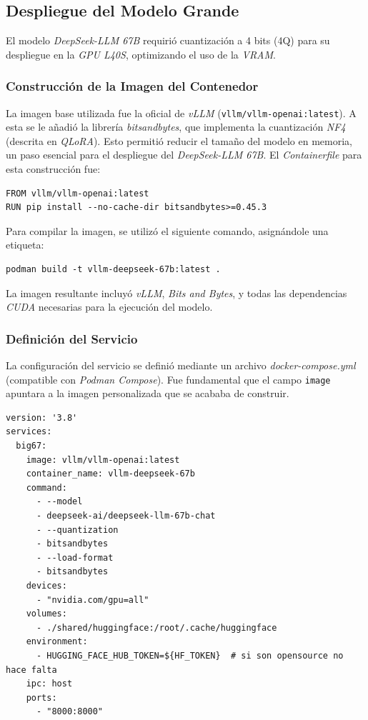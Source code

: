\subsection{Despliegue del Modelo Grande}
El modelo \textit{DeepSeek-LLM 67B} requirió cuantización a 4 bits (4Q) para su despliegue en la \textit{GPU L40S}, optimizando el uso de la \textit{VRAM}.

\subsubsection{Construcción de la Imagen del Contenedor}
La imagen base utilizada fue la oficial de \textit{vLLM} (\texttt{vllm/vllm-openai:latest}). A esta se le añadió la librería \textit{bitsandbytes}, que implementa la cuantización \textit{NF4} (descrita en \textit{QLoRA}). Esto permitió reducir el tamaño del modelo en memoria, un paso esencial para el despliegue del \textit{DeepSeek-LLM 67B}.
El \textit{Containerfile} para esta construcción fue:
\begin{verbatim}
FROM vllm/vllm-openai:latest
RUN pip install --no-cache-dir bitsandbytes>=0.45.3
\end{verbatim}

Para compilar la imagen, se utilizó el siguiente comando, asignándole una etiqueta:
\begin{verbatim}
podman build -t vllm-deepseek-67b:latest .
\end{verbatim}

La imagen resultante incluyó \textit{vLLM}, \textit{Bits and Bytes}, y todas las dependencias \textit{CUDA} necesarias para la ejecución del modelo.

\subsubsection{Definición del Servicio}
La configuración del servicio se definió mediante un archivo \textit{docker-compose.yml} (compatible con \textit{Podman Compose}). Fue fundamental que el campo \texttt{image} apuntara a la imagen personalizada que se acababa de construir.
\begin{verbatim}
version: '3.8'
services:
  big67:
    image: vllm/vllm-openai:latest
    container_name: vllm-deepseek-67b
    command:
      - --model
      - deepseek-ai/deepseek-llm-67b-chat
      - --quantization
      - bitsandbytes
      - --load-format
      - bitsandbytes
    devices:
      - "nvidia.com/gpu=all"
    volumes:
      - ./shared/huggingface:/root/.cache/huggingface
    environment:
      - HUGGING_FACE_HUB_TOKEN=${HF_TOKEN}  # si son opensource no hace falta
    ipc: host
    ports:
      - "8000:8000"
\end{verbatim}

